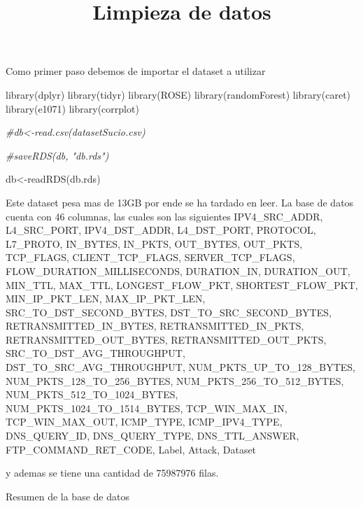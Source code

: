 \documentclass[
]{article}
\title{Limpieza de datos}
\author{}
\date{\vspace{-2.5em}}
\newenvironment{Shaded}{\begin{snugshade}}{\end{snugshade}}
\newcommand{\CommentTok}[1]{\textcolor[rgb]{0.56,0.35,0.01}{\textit{#1}}}
\newcommand{\FunctionTok}[1]{\textcolor[rgb]{0.00,0.00,0.00}{#1}}
\newcommand{\NormalTok}[1]{#1}
\newcommand{\OtherTok}[1]{\textcolor[rgb]{0.56,0.35,0.01}{#1}}
\newcommand{\SpecialCharTok}[1]{\textcolor[rgb]{0.00,0.00,0.00}{#1}}
\newcommand{\StringTok}[1]{\textcolor[rgb]{0.31,0.60,0.02}{#1}}
\begin{document}
\maketitle

Como primer paso debemos de importar el dataset a utilizar

\begin{Shaded}
\begin{Highlighting}[]
\FunctionTok{library}\NormalTok{(dplyr)}
\FunctionTok{library}\NormalTok{(tidyr)}
\FunctionTok{library}\NormalTok{(ROSE)}
\FunctionTok{library}\NormalTok{(randomForest)}
\FunctionTok{library}\NormalTok{(caret)}
\FunctionTok{library}\NormalTok{(e1071)}
\FunctionTok{library}\NormalTok{(corrplot)}

\CommentTok{\#db\textless{}{-}read.csv(\textquotesingle{}datasetSucio.csv\textquotesingle{})}

\CommentTok{\#saveRDS(db, "db.rds")}

\NormalTok{db}\OtherTok{\textless{}{-}}\FunctionTok{readRDS}\NormalTok{(}\StringTok{\textquotesingle{}db.rds\textquotesingle{}}\NormalTok{)}
\end{Highlighting}
\end{Shaded}

Este dataset pesa mas de 13GB por ende se ha tardado en leer. La base de
datos cuenta con 46 columnas, las cuales son las siguientes
IPV4\_SRC\_ADDR, L4\_SRC\_PORT, IPV4\_DST\_ADDR, L4\_DST\_PORT,
PROTOCOL, L7\_PROTO, IN\_BYTES, IN\_PKTS, OUT\_BYTES, OUT\_PKTS,
TCP\_FLAGS, CLIENT\_TCP\_FLAGS, SERVER\_TCP\_FLAGS,
FLOW\_DURATION\_MILLISECONDS, DURATION\_IN, DURATION\_OUT, MIN\_TTL,
MAX\_TTL, LONGEST\_FLOW\_PKT, SHORTEST\_FLOW\_PKT, MIN\_IP\_PKT\_LEN,
MAX\_IP\_PKT\_LEN, SRC\_TO\_DST\_SECOND\_BYTES,
DST\_TO\_SRC\_SECOND\_BYTES, RETRANSMITTED\_IN\_BYTES,
RETRANSMITTED\_IN\_PKTS, RETRANSMITTED\_OUT\_BYTES,
RETRANSMITTED\_OUT\_PKTS, SRC\_TO\_DST\_AVG\_THROUGHPUT,
DST\_TO\_SRC\_AVG\_THROUGHPUT, NUM\_PKTS\_UP\_TO\_128\_BYTES,
NUM\_PKTS\_128\_TO\_256\_BYTES, NUM\_PKTS\_256\_TO\_512\_BYTES,
NUM\_PKTS\_512\_TO\_1024\_BYTES, NUM\_PKTS\_1024\_TO\_1514\_BYTES,
TCP\_WIN\_MAX\_IN, TCP\_WIN\_MAX\_OUT, ICMP\_TYPE, ICMP\_IPV4\_TYPE,
DNS\_QUERY\_ID, DNS\_QUERY\_TYPE, DNS\_TTL\_ANSWER,
FTP\_COMMAND\_RET\_CODE, Label, Attack, Dataset

y ademas se tiene una cantidad de 75987976 filas.

Resumen de la base de datos

\begin{Shaded}
\end{Shaded}
\end{document}
